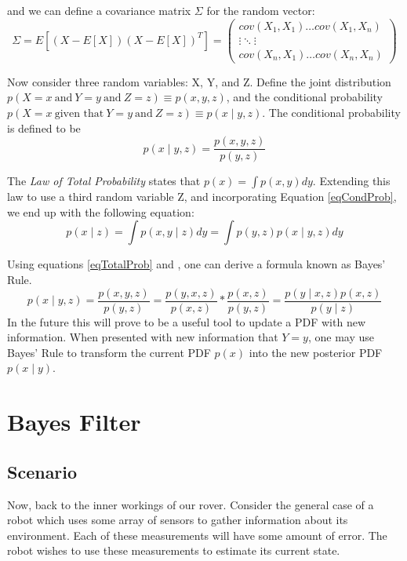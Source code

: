 and we can define a covariance matrix \(\Sigma\) for the random vector:
\[
\Sigma = E[(X - E[X])(X - E[X])^T] = \begin{pmatrix}
cov(X_1,X_1)  \dots cov(X_1,X_n) \\
\vdots \ddots \vdots \\
cov(X_n,X_1)  \dots cov(X_n,X_n)
\end{pmatrix} 
\]


Now consider three random variables: X, Y, and Z. Define the joint distribution \(p(X=x\ \textrm{and}\ Y=y\ \textrm{and}\ Z=z) \equiv p(x,y,z)\), and the conditional probability \(p(X=x\ \textrm{given that}\ Y=y\ \textrm{and}\ Z=z) \equiv p(x \mathbin{\vert} y,z)\). The conditional probability is defined to be
\begin{equation} \label{eqCondProb}
p(x \mathbin{\vert} y,z) = \frac{p(x,y,z)}{p(y,z)}
\end{equation}

The \textit{Law of Total Probability} states that \(p(x) = \int p(x,y)dy\). Extending this law to use a third random variable Z, and incorporating Equation \ref{eqCondProb}, we end up with the following equation:
\begin{equation} \label{eqTotalProb}
p(x \mathbin{\vert} z) = \int p(x,y \mathbin{\vert} z)dy
= \int p(y,z)p(x \mathbin{\vert} y,z)dy
\end{equation}

Using equations \ref{eqTotalProb} and , one can derive a formula known as Bayes' Rule. 
\begin{equation} \label{eqBayesThm}
p(x \mathbin{\vert} y,z) = \frac{p(x,y,z)}{p(y,z)} = \frac{p(y,x,z)}{p(x,z)} * \frac{p(x,z)}{p(y,z)} = \frac{p(y \mathbin{\vert} x,z)p(x,z)}{p(y \mathbin{\vert} z)}
\end{equation}
In the future this will prove to be a useful tool to update a PDF with new information. When presented with new information that  \(Y = y\), one may use Bayes' Rule to transform the current PDF \(p(x)\) into the new posterior PDF \(p(x \mathbin{\vert} y)\). %

\section{Bayes Filter}
\subsection{Scenario}
Now, back to the inner workings of our rover. Consider the general case of a robot which uses some array of sensors to gather information about its environment. Each of these measurements will have some amount of error. The robot wishes to use these measurements to estimate its current state.

